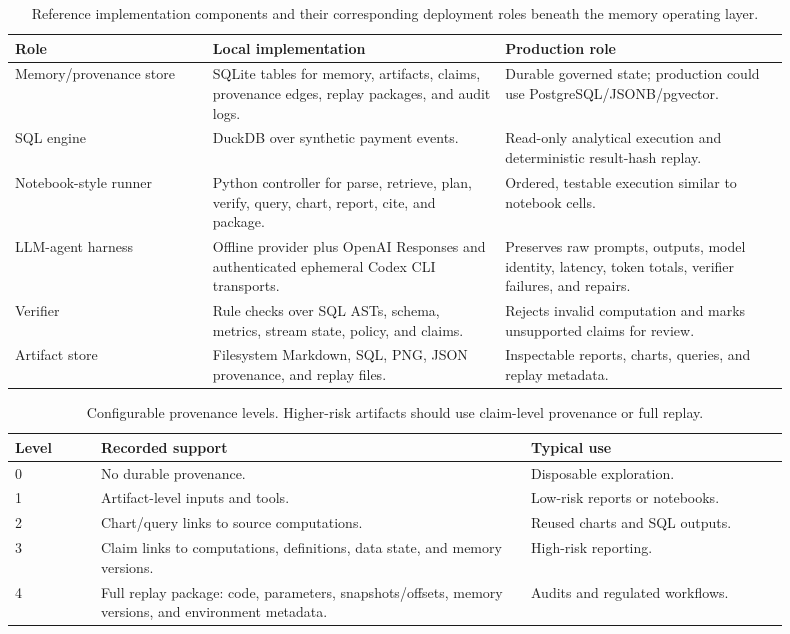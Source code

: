 \documentclass[10pt]{article}
\begin{document}
\begin{table}[p]
\centering
\small
\begin{tabular}{L{0.23\linewidth}L{0.34\linewidth}L{0.33\linewidth}}
\toprule
\textbf{Role} & \textbf{Local implementation} & \textbf{Production role} \\
\midrule
Memory/provenance store & SQLite tables for memory, artifacts, claims, provenance edges, replay packages, and audit logs. & Durable governed state; production could use PostgreSQL/JSONB/pgvector. \\
SQL engine & DuckDB over synthetic payment events. & Read-only analytical execution and deterministic result-hash replay. \\
Notebook-style runner & Python controller for parse, retrieve, plan, verify, query, chart, report, cite, and package. & Ordered, testable execution similar to notebook cells. \\
LLM-agent harness & Offline provider plus OpenAI Responses and authenticated ephemeral Codex CLI transports. & Preserves raw prompts, outputs, model identity, latency, token totals, verifier failures, and repairs. \\
Verifier & Rule checks over SQL ASTs, schema, metrics, stream state, policy, and claims. & Rejects invalid computation and marks unsupported claims for review. \\
Artifact store & Filesystem Markdown, SQL, PNG, JSON provenance, and replay files. & Inspectable reports, charts, queries, and replay metadata. \\
\bottomrule
\end{tabular}
\caption{Reference implementation components and their corresponding deployment roles beneath the memory operating layer.}
\label{tab:prototype}
\end{table}

\begin{table}[p]
\centering
\small
\begin{tabular}{C{0.10\linewidth}L{0.50\linewidth}L{0.30\linewidth}}
\toprule
\textbf{Level} & \textbf{Recorded support} & \textbf{Typical use} \\
 & No durable provenance. & Disposable exploration. \\
1 & Artifact-level inputs and tools. & Low-risk reports or notebooks. \\
2 & Chart/query links to source computations. & Reused charts and SQL outputs. \\
3 & Claim links to computations, definitions, data state, and memory versions. & High-risk reporting. \\
4 & Full replay package: code, parameters, snapshots/offsets, memory versions, and environment metadata. & Audits and regulated workflows. \\
\bottomrule
\end{tabular}
\caption{Configurable provenance levels. Higher-risk artifacts should use claim-level provenance or full replay.}
\label{tab:provlevels}
\end{table}
\end{document}
